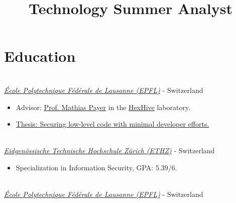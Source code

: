 \documentclass[mm, 11pt]{simple_style}
\begin{document}
\begin{resume}
\begin{position}
\end{position}
\begin{position}
    \title{Technology Summer Analyst}
\end{position}
\vspace{-\parskip}
\sectionline
\section{Education}

\\
\textsl{\href{https://ic.epfl.ch/en}{\'Ecole Polytechnique F\'ed\'erale de Lausanne (EPFL)}} - Switzerland
\begin{itemize}
  \item Advisor: \href{https://nebelwelt.net/}{Prof. Mathias Payer} in the \href{https://hexhive.epfl.ch}{HexHive} laboratory.
  \item \href{https://infoscience.epfl.ch/entities/publication/5c91711a-5bf2-4fe0-b04e-830ac3a13bfb}{Thesis: Securing low-level code with minimal developer efforts.}
\end{itemize}


\\
\textsl{\href{https://www.inf.ethz.ch/}{Eidgen\"ossische Technische Hochschule Z\"urich (ETHZ)}} - Switzerland

\begin{itemize}
  \item  Specialization in Information Security, GPA: 5.39/6.
\end{itemize}
\\
\textsl{\href{https://ic.epfl.ch/en}{\'Ecole Polytechnique F\'ed\'erale de Lausanne (EPFL)}} - Switzerland


\end{resume}
\end{document}
